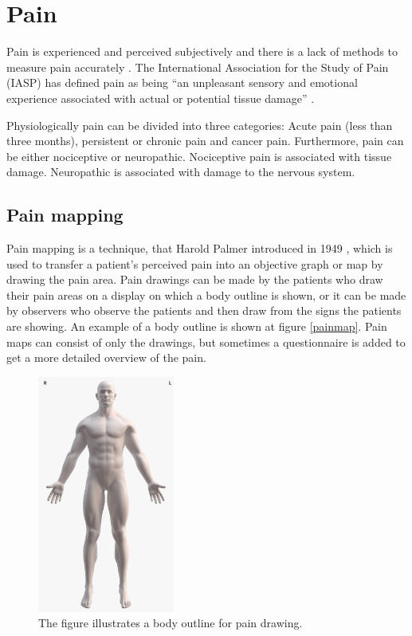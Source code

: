 \section{Pain}
Pain is experienced and perceived subjectively and there is a lack of methods to measure pain accurately \citep{IASP2012, Younger2009}. 
The International Association for the Study of Pain (IASP) has defined pain as being “an unpleasant sensory and emotional experience associated with actual or potential tissue damage” \citep{IASP2012}.

Physiologically pain can be divided into three categories: Acute pain (less than three months), persistent or chronic pain and cancer pain. Furthermore, pain can be either nociceptive or neuropathic. Nociceptive pain is associated with tissue damage. Neuropathic is associated with damage to the nervous system.\citep{Briggs2010} 

\subsection{Pain mapping}
Pain mapping is a technique, that Harold Palmer introduced in 1949 \citep{Grunnesjo2006}, which is used to transfer a patient’s perceived pain into an objective graph or map by drawing the pain area. Pain drawings can be made by the patients who draw their pain areas on a display on which a body outline is shown, or it can be made by observers who observe the patients and then draw from the signs the patients are showing. An example of a body outline is shown at figure \ref{painmap}. Pain maps can consist of only the drawings, but sometimes a questionnaire is added to get a more detailed overview of the pain.\citep{Schott2010}

\begin{figure} [H]
\centering
\includegraphics[width=0.4\textwidth]{figures/painmap}
\caption{The figure illustrates a body outline for pain drawing.}
\label{fig:painmap}
\end{figure}

